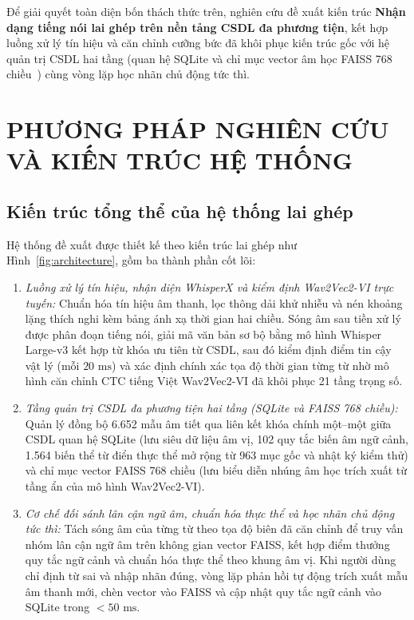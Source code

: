 \documentclass[12pt,a4paper]{article}
\begin{document}
Để giải quyết toàn diện bốn thách thức trên, nghiên cứu đề xuất kiến trúc \textbf{Nhận dạng tiếng nói lai ghép trên nền tảng CSDL đa phương tiện}, kết hợp luồng xử lý tín hiệu và căn chỉnh cưỡng bức đã khôi phục kiến trúc gốc với hệ quản trị CSDL hai tầng (quan hệ SQLite và chỉ mục vector âm học FAISS 768 chiều~\cite{johnson2019faiss}) cùng vòng lặp học nhãn chủ động tức thì.

\section{PHƯƠNG PHÁP NGHIÊN CỨU VÀ KIẾN TRÚC HỆ THỐNG}

\subsection{Kiến trúc tổng thể của hệ thống lai ghép}
Hệ thống đề xuất được thiết kế theo kiến trúc lai ghép như Hình~\ref{fig:architecture}, gồm ba thành phần cốt lõi:
\begin{enumerate}
  \item \textit{Luồng xử lý tín hiệu, nhận diện WhisperX và kiểm định Wav2Vec2-VI trực tuyến:} Chuẩn hóa tín hiệu âm thanh, lọc thông dải khử nhiễu và nén khoảng lặng thích nghi kèm bảng ánh xạ thời gian hai chiều. Sóng âm sau tiền xử lý được phân đoạn tiếng nói, giải mã văn bản sơ bộ bằng mô hình Whisper Large-v3 kết hợp từ khóa ưu tiên từ CSDL, sau đó kiểm định điểm tin cậy vật lý (mỗi $20\text{ ms}$) và xác định chính xác tọa độ thời gian từng từ nhờ mô hình căn chỉnh CTC tiếng Việt Wav2Vec2-VI đã khôi phục 21 tầng trọng số.
  \item \textit{Tầng quản trị CSDL đa phương tiện hai tầng (SQLite và FAISS 768 chiều):} Quản lý đồng bộ 6.652 mẫu âm tiết qua liên kết khóa chính một--một giữa CSDL quan hệ SQLite (lưu siêu dữ liệu âm vị, 102 quy tắc biến âm ngữ cảnh, 1.564 biến thể từ điển thực thể mở rộng từ 963 mục gốc và nhật ký kiểm thử) và chỉ mục vector FAISS 768 chiều (lưu biểu diễn nhúng âm học trích xuất từ tầng ẩn của mô hình Wav2Vec2-VI).
  \item \textit{Cơ chế đối sánh lân cận ngữ âm, chuẩn hóa thực thể và học nhãn chủ động tức thì:} Tách sóng âm của từng từ theo tọa độ biên đã căn chỉnh để truy vấn nhóm lân cận ngữ âm trên không gian vector FAISS, kết hợp điểm thưởng quy tắc ngữ cảnh và chuẩn hóa thực thể theo khung âm vị. Khi người dùng chỉ định từ sai và nhập nhãn đúng, vòng lặp phản hồi tự động trích xuất mẫu âm thanh mới, chèn vector vào FAISS và cập nhật quy tắc ngữ cảnh vào SQLite trong $< 50\text{ ms}$.
\end{enumerate}
\end{document}
